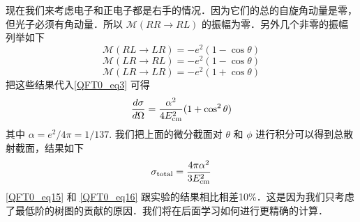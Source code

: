 现在我们来考虑电子和正电子都是右手的情况．因为它们的总的自旋角动量是零，但光子必须有角动量．所以 $\mathcal M (RR \rightarrow RL)$ 的振幅为零．另外几个非零的振幅列举如下
\begin{equation}
\mathcal M(RL\rightarrow LR) = - e^2(1-\cos\theta)  
\end{equation}
\begin{equation}
\mathcal M(LR\rightarrow RL) = - e^2 (1-\cos\theta)
\end{equation}
\begin{equation}
\mathcal M(LR \rightarrow LR) = - e^2(1+\cos\theta)
\end{equation}
把这些结果代入\autoref{QFT0_eq3} 可得
\begin{equation}\label{QFT0_eq15}
\frac{d\sigma}{d\Omega}  = \frac{\alpha^2}{4E_{\rm cm}^2}(1+\cos^2\theta) 
\end{equation} 
其中 $\alpha = e^2/4\pi=1/137$. 我们把上面的微分截面对 $\theta$ 和 $\phi$ 进行积分可以得到总散射截面，结果如下
\begin{equation}\label{QFT0_eq16}
\sigma_{\rm total} = \frac{4\pi \alpha^2}{3E_{\rm cm}^2}
\end{equation}
\autoref{QFT0_eq15} 和 \autoref{QFT0_eq16} 跟实验的结果相比相差10\%．这是因为我们只考虑了最低阶的树图的贡献的原因．我们将在后面学习如何进行更精确的计算．





























